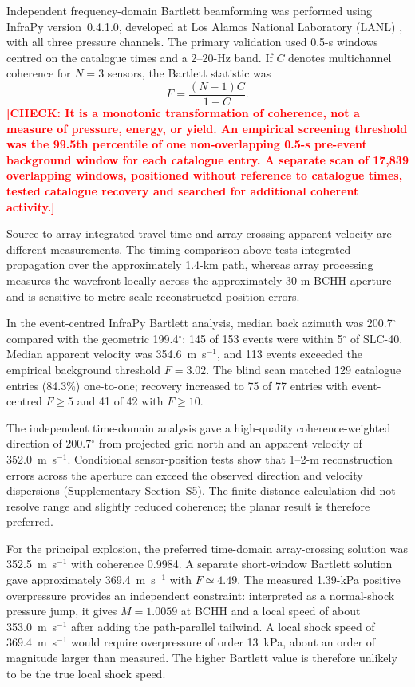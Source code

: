\documentclass[]{seismica}
\newcommand{\checkme}[1]{\textcolor{red}{\textbf{[CHECK: #1]}}}
\begin{document}
Independent frequency-domain Bartlett beamforming was performed using InfraPy
version~0.4.1.0, developed at Los Alamos National Laboratory (LANL)
\citep{webster_infrapy_2025}, with all three pressure channels. The primary
validation used 0.5-s windows centred on the catalogue times and a 2--20-Hz
band. If $C$ denotes multichannel coherence for $N=3$ sensors, the Bartlett
statistic was
\begin{equation}
 F=\frac{(N-1)C}{1-C}.
\end{equation}
\checkme{It is a monotonic transformation of coherence, not a measure of pressure,
energy, or yield. An empirical screening threshold was the 99.5th percentile
of one non-overlapping 0.5-s pre-event background window for each catalogue
entry. A separate scan of 17,839 overlapping windows, positioned without
reference to catalogue times, tested catalogue recovery and searched for
additional coherent activity.}

Source-to-array integrated travel time and array-crossing apparent velocity are
different measurements. The timing comparison above tests integrated
propagation over the approximately 1.4-km path, whereas array processing
measures the wavefront locally across the approximately 30-m BCHH aperture and
is sensitive to metre-scale reconstructed-position errors.

In the event-centred InfraPy Bartlett analysis, median back azimuth was
200.7$^\circ$ compared with the geometric 199.4$^\circ$; 145 of 153 events
were within 5$^\circ$ of SLC-40. Median apparent velocity was
354.6~m~s$^{-1}$, and 113 events exceeded the empirical background threshold
$F=3.02$. The blind scan matched 129 catalogue entries (84.3\%) one-to-one;
recovery increased to 75 of 77 entries with event-centred $F\geq5$ and 41 of
42 with $F\geq10$.

The independent time-domain analysis gave a high-quality coherence-weighted
direction of 200.7$^\circ$ from projected grid north and an apparent velocity
of 352.0~m~s$^{-1}$. Conditional sensor-position tests show that 1--2-m
reconstruction errors across the aperture can exceed the observed direction
and velocity dispersions (Supplementary Section~S5). The finite-distance
calculation did not resolve range and slightly reduced coherence; the planar
result is therefore preferred.

For the principal explosion, the preferred time-domain array-crossing solution
was 352.5~m~s$^{-1}$ with coherence 0.9984. A separate short-window Bartlett
solution gave approximately 369.4~m~s$^{-1}$ with $F\simeq4.49$. The measured
1.39-kPa positive overpressure provides an independent constraint: interpreted
as a normal-shock pressure jump, it gives $M=1.0059$ at BCHH and a local speed
of about 353.0~m~s$^{-1}$ after adding the path-parallel tailwind. A local
shock speed of 369.4~m~s$^{-1}$ would require overpressure of order 13~kPa,
about an order of magnitude larger than measured. The higher Bartlett value is
therefore unlikely to be the true local shock speed.
\end{document}
